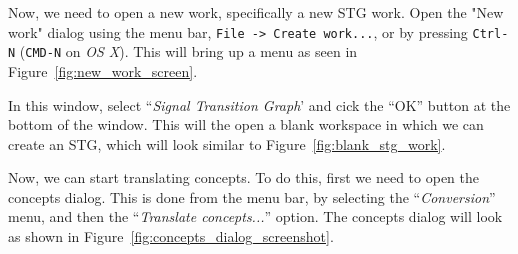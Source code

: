 \documentclass[british,conference,compsoc]{IEEEtran}
\begin{document}
Now, we need to open a new work, specifically a new STG work. Open the "New work" dialog using the menu bar, \texttt{File -> Create work...}, or by pressing \texttt{Ctrl-N} 
(\texttt{CMD-N} on \emph{OS X}). This will bring up a menu as seen in Figure~\ref{fig:new_work_screen}.

%
%
%

In this window, select ``\emph{Signal Transition Graph}' and cick the ``OK'' button at the bottom of the window. This will the open a blank workspace in which we can create an STG, which 
will look similar to Figure~\ref{fig:blank_stg_work}.

%
%
%

Now, we can start translating concepts. To do this, first we need to open the concepts dialog.  This is done from the menu bar, by selecting the ``\emph{Conversion}'' menu, and then the 
``\emph{Translate concepts...}'' option. The concepts dialog will look as shown in Figure~\ref{fig:concepts_dialog_screenshot}.
\end{document}
